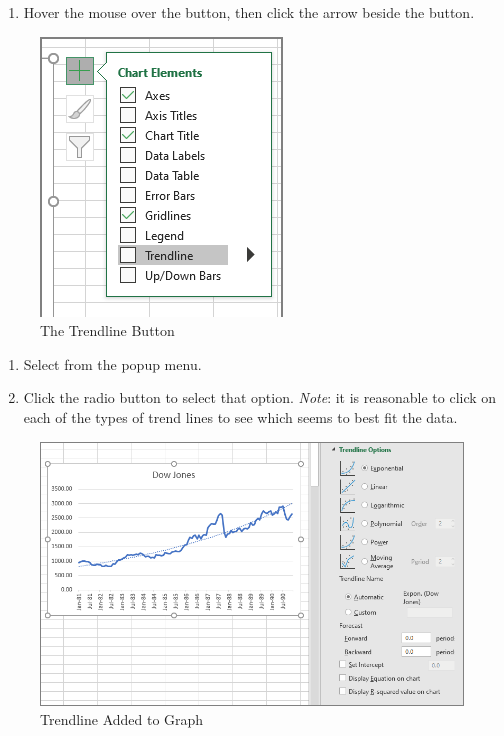 \begin{enumerate}[resume]

	\item Hover the mouse over the  button, then click the arrow beside the button.

\end{enumerate}

\begin{figure}[H]
	\centering
	\includegraphics[width=\maxwidth{.95\linewidth}]{gfx/ch08_fig08}
	\caption{The Trendline Button}
	\label{08:fig08}
\end{figure}

\begin{enumerate}[resume]
	
	\item Select  from the  popup menu.
	\item Click the  radio button to select that option. \textit{Note}: it is reasonable to click on each of the types of trend lines to see which seems to best fit the data.
\end{enumerate}

\begin{figure}[H]
	\centering
	\includegraphics[width=\maxwidth{.95\linewidth}]{gfx/ch08_fig09}
	\caption{Trendline Added to Graph}
	\label{08:fig09}
\end{figure}

